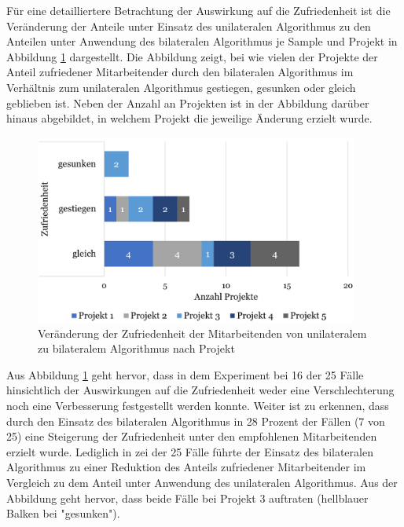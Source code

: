 Für eine detailliertere Betrachtung der Auswirkung auf die Zufriedenheit ist die Veränderung der Anteile unter Einsatz des unilateralen Algorithmus zu den Anteilen unter Anwendung des bilateralen Algorithmus je Sample und Projekt in Abbildung \ref{fig:ergebnisse:abb9} dargestellt.
Die Abbildung zeigt, bei wie vielen der Projekte der Anteil zufriedener Mitarbeitender durch den bilateralen Algorithmus im Verhältnis zum unilateralen Algorithmus gestiegen, gesunken oder gleich geblieben ist.
Neben der Anzahl an Projekten ist in der Abbildung darüber hinaus abgebildet, in welchem Projekt die jeweilige Änderung erzielt wurde.

\begin{figure}[H]
    \centering
	\includegraphics[width=0.95\textwidth]{gfx/verhaeltnis-z-projekte.png}
	\caption[Veränderung der Zufriedenheit der Mitarbeitenden von unilateralem zu bilateralem Algorithmus nach Projekt]{Veränderung der Zufriedenheit der Mitarbeitenden von unilateralem zu bilateralem Algorithmus nach Projekt}
	\label{fig:ergebnisse:abb9}
\end{figure}

Aus Abbildung \ref{fig:ergebnisse:abb9} geht hervor, dass in dem Experiment bei 16 der 25 Fälle hinsichtlich der Auswirkungen auf die Zufriedenheit weder eine Verschlechterung noch eine Verbesserung festgestellt werden konnte.
Weiter ist zu erkennen, dass durch den Einsatz des bilateralen Algorithmus in 28 Prozent der Fällen (7 von 25) eine Steigerung der Zufriedenheit unter den empfohlenen Mitarbeitenden erzielt wurde.
Lediglich in zei der 25 Fälle führte der Einsatz des bilateralen Algorithmus zu einer Reduktion des Anteils zufriedener Mitarbeitender im Vergleich zu dem Anteil unter Anwendung des unilateralen Algorithmus.
Aus der Abbildung geht hervor, dass beide Fälle bei Projekt 3 auftraten (hellblauer Balken bei "gesunken").

